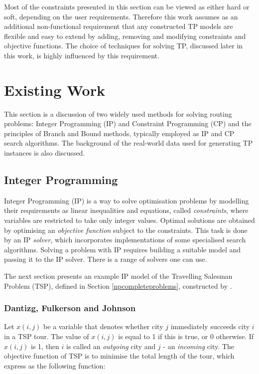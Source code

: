 \documentclass{mpaper}
\begin{document}
Most of the constraints presented in this section can be viewed as either hard or soft, depending on the user requirements. Therefore this work assumes as an additional non-functional requirement that any constructed TP models are flexible and easy to extend by adding, removing and modifying constraints and objective functions. The choice of techniques for solving TP, discussed later in this work, is highly influenced by this requirement.

\section{Existing Work}
\label{existingwork}

This section is a discussion of two widely used methods for solving routing problems: Integer Programming (IP) and Constraint Programming (CP) and the principles of Branch and Bound methods, typically employed as IP and CP search algorithms. The background of the real-world data used for generating TP instances is also discussed.

\subsection{Integer Programming}
\label{sec:ip}

Integer Programming (IP) is a way to solve optimisation problems by modelling their requirements as linear inequalities and equations, called \textit{constraints}, where variables are restricted to take only integer values. Optimal solutions are obtained by optimising an \textit{objective function} subject to the constraints. This task is done by an IP \textit{solver}, which incorporates implementations of some specialised search algorithms. Solving a problem with IP requires building a suitable model and passing it to the IP solver. There is a range of solvers one can use.

The next section presents an example IP model of the Travelling Salesman Problem (TSP), defined in Section \ref{npcompleteproblems}, constructed by \citet{Dantzig54}.

\subsubsection*{Dantizg, Fulkerson and Johnson}
Let $x(i,j)$ be a variable that denotes whether city $j$ immediately succeeds city $i$ in a TSP tour. The value of $x(i,j)$ is equal to 1 if this is true, or 0 otherwise. If $x(i,j)$ is 1, then $i$ is called an \textit{outgoing} city and $j$ - an \textit{incoming} city. The objective function of TSP is to minimise the total length of the tour, which \citet{Dantzig54} express as the following function:
\end{document}
